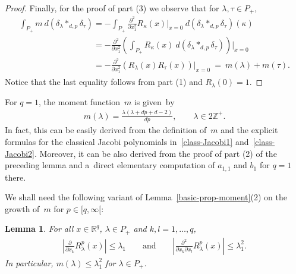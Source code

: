 \documentclass[pdftex]{sigma}
\numberwithin{equation}{section}
\newtheorem{Lemma}[Theorem]{Lemma}
\begin{document}
\begin{proof}
Finally, for the proof of part (3) we observe that for $\lambda,\tau\in P_+$,
\begin{gather*}
\int_{P_+} m\> d(\delta_\lambda*_{d,p}\delta_\tau)
=-\int_{P_+} \frac{\partial^2}{\partial x_1^2}R_\kappa(x)\bigg|_{x=0} \> d(\delta_\lambda*_{d,p}\delta_\tau)(\kappa)
\\
\phantom{\int_{P_+} m\> d(\delta_\lambda*_{d,p}\delta_\tau)}
=-\frac{\partial^2}{\partial x_1^2}\left(\int_{P_+} R_\kappa(x)\>d(\delta_\lambda*_{d,p}\delta_\tau)\right)\bigg|_{x=0}
\\
\phantom{\int_{P_+} m\> d(\delta_\lambda*_{d,p}\delta_\tau)}
=-\frac{\partial^2}{\partial x_1^2}\left(R_\lambda(x)R_\tau(x)\right)\bigg|_{x=0} \>=\> m(\lambda)+m(\tau).
\end{gather*}
Notice that the last equality follows from part (1) and $R_\lambda(0)=1$.
\end{proof}

\begin{Example}
 For $q=1$, the moment function~$m$ is given~by
\begin{gather*}
m(\lambda)= \frac{\lambda(\lambda+dp+d-2)}{dp},
\qquad
\lambda\in 2\mathbb Z^+.
\end{gather*}
In fact, this can be easily derived from the def\/inition of~$m$ and the explicit formulas for the classical Jacobi
polynomials in~\eqref{class-Jacobi1} and~\eqref{class-Jacobi2}.
Moreover, it can be also derived from the proof of part (2) of the preceding lemma and a~direct elementary computation
of $a_{1,1}$ and $b_1$ for $q=1$ there.
\end{Example}

We shall need the following variant of Lemma~\ref{basic-prop-moment}(2) on the growth of~$m$ for $p\in[q,\infty[$:

\begin{Lemma}
\label{quad-wachstum-oben}
For all $x\in\mathbb R^q$, $\lambda\in P_+$ and $k,l=1,\ldots,q$,
\begin{gather*}
\left|\frac{\partial}{\partial x_k} R_\lambda^p(x)\right|\leq \lambda_1
\qquad
\text{and}
\qquad
\left|\frac{\partial^2}{\partial x_k\partial x_l} R_\lambda^p(x)\right|\leq \lambda_1^2.
\end{gather*}
In particular, $m(\lambda)\leq \lambda_1^2$ for $\lambda\in P_+$.
\end{Lemma}
\end{document}
